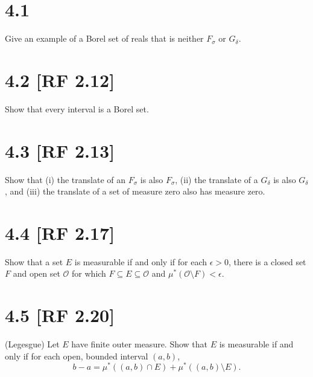 \documentclass[12pt]{article}
\begin{document}
\section*{4.1}
Give an example of a Borel set of reals that is neither $F_{\sigma}$ or $G_{\delta}$.



\section*{4.2 [RF 2.12]}
Show that every interval is a Borel set.



\section*{4.3 [RF 2.13]}
Show that (i) the translate of an $F_{\sigma}$ is also $F_{\sigma}$, (ii) the translate of a $G_{\delta}$ is also $G_{\delta}$, and (iii) the
translate of a set of measure zero also has measure zero.


\section*{4.4 [RF 2.17]}
Show that a set $E$ is measurable if and only if for each $\epsilon > 0$, there is a closed set $F$ and open set $\mathcal{O}$ for which $F \subseteq E\subseteq
\mathcal{O}$ and $\mu^{*}(\mathcal{O}\setminus F) < \epsilon$.



\section*{4.5 [RF 2.20]}
(Legesgue) Let $E$ have finite outer measure. Show that $E$ is measurable if and only if for each open, bounded interval $(a,b)$,
\[ b - a = \mu^{*}\left( (a,b) \cap E \right) + \mu^{*}\left( (a,b) \setminus E \right). \]
\end{document}
